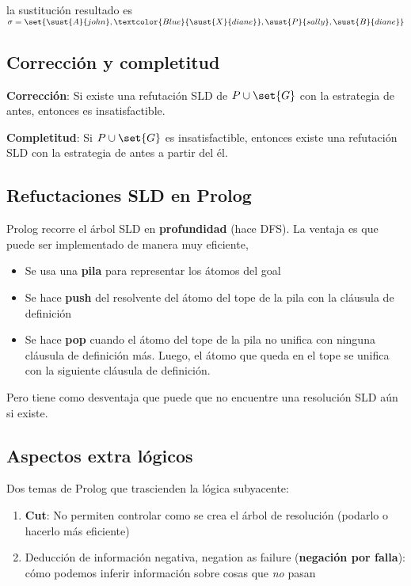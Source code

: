 \documentclass{report}
\theoremstyle{definition} %
\newcommand{\select}[1]{\textcolor{Blue}{#1}}
\begin{document}
la sustitución resultado es
$\sigma = \set{
    \sust{A}{john},
    \select{\sust{X}{diane}},
    \sust{P}{sally},
    \sust{B}{diane}
}$

\subsection{Corrección y completitud}

\textbf{Corrección}: Si existe una refutación SLD de $P \cup \set{G}$ con la
estrategia de antes, entonces es insatisfactible.

\textbf{Completitud}: Si $P \cup \set{G}$ es insatisfactible, entonces existe
una refutación SLD con la estrategia de antes a partir del él.

\subsection{Refuctaciones SLD en Prolog}

Prolog recorre el árbol SLD en \textbf{profundidad} (hace DFS). La ventaja es
que puede ser implementado de manera muy eficiente,

\begin{itemize}
    \item Se usa una \textbf{pila} para representar los átomos del goal
    \item Se hace \textbf{push} del resolvente del átomo del tope de la pila con
    la cláusula de definición
    \item Se hace \textbf{pop} cuando el átomo del tope de la pila no unifica
    con ninguna cláusula de definición más. Luego, el átomo que queda en el tope
    se unifica con la siguiente cláusula de definición.
\end{itemize}

Pero tiene como desventaja que puede que no encuentre una resolución SLD aún si
existe.

\subsection{Aspectos extra lógicos}

Dos temas de Prolog que trascienden la lógica subyacente:

\begin{enumerate}
    \item \textbf{Cut}: No permiten controlar como se crea el árbol de
    resolución (podarlo o hacerlo más eficiente)
    \item Deducción de información negativa, negation as failure
    (\textbf{negación por falla}): cómo podemos inferir información sobre cosas
    que \textit{no} pasan
\end{enumerate}
\end{document}
